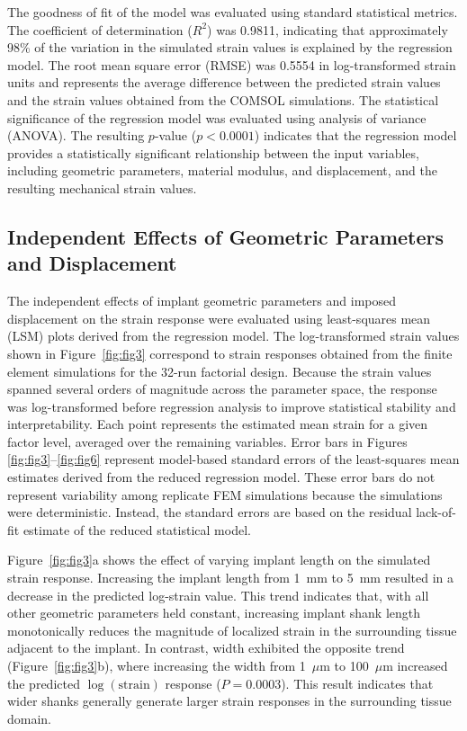 \documentclass[fleqn,10pt]{wlscirep}
\begin{document}
The goodness of fit of the model was evaluated using standard statistical metrics. The coefficient of determination ($R^2$) was 0.9811, indicating that approximately 98\% of the variation in the simulated strain values is explained by the regression model. The root mean square error (RMSE) was 0.5554 in log-transformed strain units and represents the average difference between the predicted strain values and the strain values obtained from the COMSOL simulations. The statistical significance of the regression model was evaluated using analysis of variance (ANOVA). The resulting $p$-value ($p < 0.0001$) indicates that the regression model provides a statistically significant relationship between the input variables, including geometric parameters, material modulus, and displacement, and the resulting mechanical strain values.


\subsection{Independent Effects of Geometric Parameters and Displacement}

The independent effects of implant geometric parameters and imposed displacement on the strain response were evaluated using least-squares mean (LSM) plots derived from the regression model. The log-transformed strain values shown in Figure~\ref{fig:fig3} correspond to strain responses obtained from the finite element simulations for the 32-run factorial design. Because the strain values spanned several orders of magnitude across the parameter space, the response was log-transformed before regression analysis to improve statistical stability and interpretability. Each point represents the estimated mean strain for a given factor level, averaged over the remaining variables. Error bars in Figures \ref{fig:fig3}–\ref{fig:fig6} represent model-based standard errors of the least-squares mean estimates derived from the reduced regression model. These error bars do not represent variability among replicate FEM simulations because the simulations were deterministic. Instead, the standard errors are based on the residual lack-of-fit estimate of the reduced statistical model.

Figure~\ref{fig:fig3}a shows the effect of varying implant length on the simulated strain response. Increasing the implant length from 1~mm to 5~mm resulted in a decrease in the predicted log-strain value. This trend indicates that, with all other geometric parameters held constant, increasing implant shank length monotonically reduces the magnitude of localized strain in the surrounding tissue adjacent to the implant. In contrast, width exhibited the opposite trend (Figure~\ref{fig:fig3}b), where increasing the width from 1~$\mu$m to 100~$\mu$m increased the predicted $\log(\mathrm{strain})$ response ($P = 0.0003$). This result indicates that wider shanks generally generate larger strain responses in the surrounding tissue domain.
\end{document}
